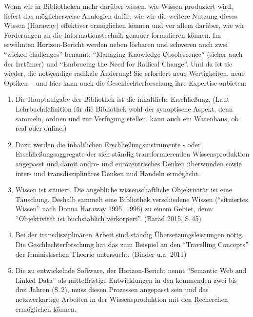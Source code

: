 Wenn wir in Bibliotheken mehr darüber wissen, wie Wissen produziert
wird, liefert das möglicherweise Analogien dafür, wie wir die weitere
Nutzung dieses Wissen (Haraway) effektiver ermöglichen können und vor
allem darüber, wie wir Forderungen an die Informationstechnik genauer
formulieren können. Im erwähnten Horizon-Bericht werden neben lösbaren
und schweren auch zwei \enquote{wicked challenges} benannt:
\enquote{Managing Knowledge Obsolescence} (sicher auch der Irrtümer) und
\enquote{Embracing the Need for Radical Change}. Und da ist sie wieder,
die notwendige radikale Änderung! Sie erfordert neue Wertigkeiten, neue
Optiken -- und hier kann auch die Geschlechterforschung ihre Expertise
anbieten:

\begin{enumerate}
\def\labelenumi{\arabic{enumi}.}
\item
  Die Hauptaufgabe der Bibliothek ist die inhaltliche Erschließung.
  (Laut Lehrbuchdefinition für die Bibliothek wohl der synoptische
  Aspekt, denn sammeln, ordnen und zur Verfügung stellen, kann auch ein
  Warenhaus, ob real oder online.)
\item
  Dazu werden die inhaltlichen Erschließungsinstrumente - oder
  Erschließungsaggregate der sich ständig transformierenden
  Wissensproduktion angepasst und damit andro- und eurozentrisches
  Denken überwunden sowie inter- und transdisziplinäres Denken und
  Handeln ermöglicht.
\item
  Wissen ist situiert. Die angebliche wissenschaftliche Objektivität ist
  eine Täuschung. Deshalb sammelt eine Bibliothek verschiedene Wissen
  (\enquote{situiertes Wissen} nach Donna Haraway 1995, 1996) zu einem
  Gebiet, denn: \enquote{Objektivität ist buchstäblich verkörpert}.
  (Barad 2015, S.\,45)
\item
  Bei der transdisziplinären Arbeit sind ständig Übersetzungsleistungen
  nötig. Die Geschlechterforschung hat das zum Beispiel an den
  \enquote{Travelling Concepts} der feministischen Theorie untersucht.
  (Binder u.a. 2011)
\item
  Die zu entwickelnde Software, der Horizon-Bericht nennt
  \enquote{Semantic Web and Linked Data} als mittelfristige
  Entwicklungen in den kommenden zwei bis drei Jahren (S.\,2), muss
  diesen Prozessen angepasst sein und das netzwerkartige Arbeiten in der
  Wissensproduktion mit den Recherchen ermöglichen können.
\end{enumerate}

